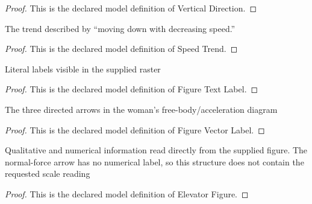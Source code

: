\begin{proof}
  This is the declared model definition of Vertical Direction.
\end{proof}
\begin{definition}
  \label{def:physics:phyx-mini-0803:phyxminiproblems-problemphyxmini0803-speedtrend}
  The trend described by “moving down with decreasing speed.”
\end{definition}
\begin{proof}
  This is the declared model definition of Speed Trend.
\end{proof}
\begin{definition}
  \label{def:physics:phyx-mini-0803:phyxminiproblems-problemphyxmini0803-figuretextlabel}
  Literal labels visible in the supplied raster
\end{definition}
\begin{proof}
  This is the declared model definition of Figure Text Label.
\end{proof}
\begin{definition}
  \label{def:physics:phyx-mini-0803:phyxminiproblems-problemphyxmini0803-figurevectorlabel}
  The three directed arrows in the woman's free-body/acceleration diagram
\end{definition}
\begin{proof}
  This is the declared model definition of Figure Vector Label.
\end{proof}
\begin{definition}
  \label{def:physics:phyx-mini-0803:phyxminiproblems-problemphyxmini0803-elevatorfigure}
  Qualitative and numerical information read directly from the supplied figure. The normal-force arrow has no numerical label, so this structure does not contain the requested scale reading
\end{definition}
\begin{proof}
  This is the declared model definition of Elevator Figure.
\end{proof}
